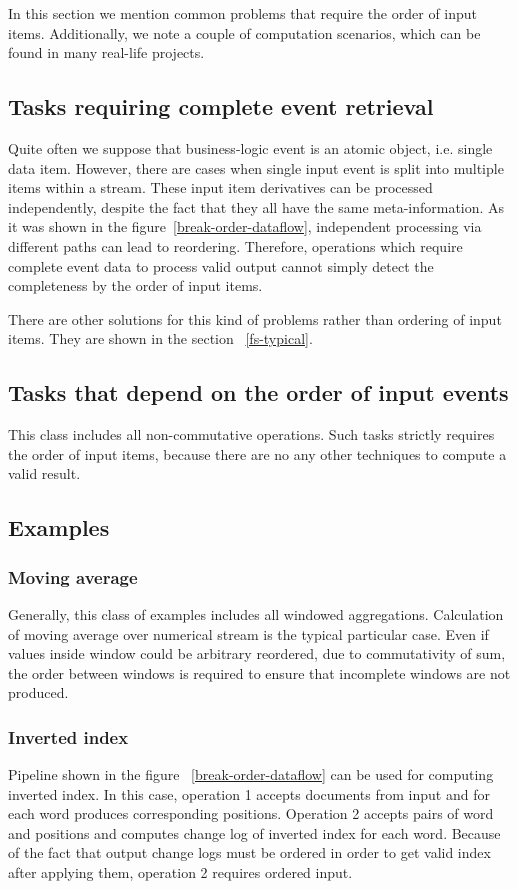
\label {fs-tasks}

In this section we mention common problems that require the order of input items. Additionally, we note a couple of computation scenarios, which can be found in many real-life projects.

\subsection{Tasks requiring complete event retrieval}
Quite often we suppose that business-logic event is an atomic object, i.e. single data item. However, there are cases when single input event is split into multiple items within a stream. These input item derivatives can be processed independently, despite the fact that they all have the same meta-information. As it was shown in the figure~\ref{break-order-dataflow}, independent processing via different paths can lead to reordering. Therefore, operations which require complete event data to process valid output cannot simply detect the completeness by the order of input items.

There are other solutions for this kind of problems rather than ordering of input items. They are shown in the section ~\ref{fs-typical}. 

\subsection{Tasks that depend on the order of input events}
This class includes all non-commutative operations. Such tasks strictly requires the order of input items, because there are no any other techniques to compute a valid result.

\subsection{Examples}

\subsubsection{Moving average}
Generally, this class of examples includes all windowed aggregations. Calculation of moving average over numerical stream is the typical particular case. Even if values inside window could be arbitrary reordered, due to commutativity of sum, the order between windows is required to ensure that incomplete windows are not produced.

\subsubsection{Inverted index}
Pipeline shown in the figure ~\ref{break-order-dataflow} can be used for computing inverted index. In this case, operation 1 accepts documents from input and for each word produces corresponding positions. Operation 2 accepts pairs of word and positions and computes change log of inverted index for each word. Because of the fact that output change logs must be ordered in order to get valid index after applying them, operation 2 requires ordered input. 
